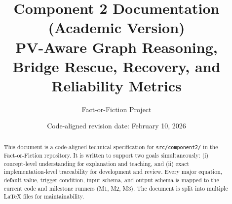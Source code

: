 \documentclass[11pt]{article}
\title{\textbf{Component 2 Documentation (Academic Version)}\\
PV-Aware Graph Reasoning, Bridge Rescue, Recovery, and Reliability Metrics}
\author{Fact-or-Fiction Project}
\date{Code-aligned revision date: February 10, 2026}
\begin{document}
\maketitle

\begin{abstract}
This document is a code-aligned technical specification for \texttt{src/component2/} in the Fact-or-Fiction repository.
It is written to support two goals simultaneously: (i) concept-level understanding for explanation and teaching, and (ii) exact implementation-level traceability for development and review.
Every major equation, default value, trigger condition, input schema, and output schema is mapped to the current code and milestone runners (M1, M2, M3).
The document is split into multiple \LaTeX{} files for maintainability.
\end{abstract}

\tableofcontents
\newpage













\end{document}

